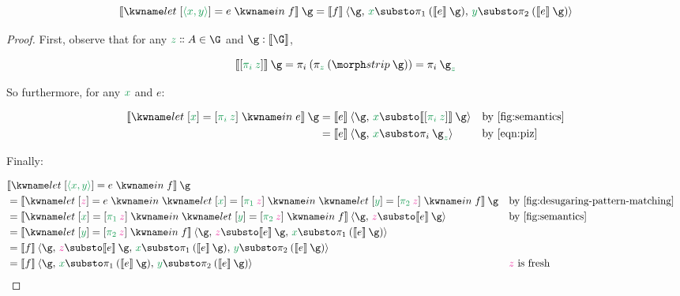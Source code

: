 \documentclass{rntz}\usepackage{fantasy}%
\begin{document}

\begin{lemma}\label{lem:letboxtuple}
  \[\den{\elet{\eboxd{\etuple{x,y}} = e} f} \<\g
  = \den{f} \<\extend{\g}{
    \dvar x \substo \pi_1\<(\den{e}\<\g),\,
    \dvar y \substo \pi_2 \<(\den{e}\<\g)}
  \]
\end{lemma}
\begin{proof}
  First, observe that for any $\hd z A \in \G$ and $\g : \den\G$,

  \nopagebreak[2]
  \begin{equation}\label{eqn:piz}
    \den{\eboxd{\pi_i\<\dvar z}}\<\g
  = \pi_i\<(\pi_{\dvar z}\<(\strip\<\g))
  = \pi_i\<\g_{\dvar z}
  \end{equation}

  \noindent So furthermore, for any $\dvar x$ and $e$:

  \nopagebreak[2]
  \begin{align*}
  \den{\elet{\eboxd{\dvar x} = \eboxd{\pi_i\<\dvar z}} e} \<\g
  &= \den{e} \<\extend{\g}{\dvar x \substo \den{\eboxd{\pi_i\<\dvar z}}\<\g}
  && \text{by \cref{fig:semantics}}\\
  &= \den{e} \<\extend{\g}{\dvar x \substo \pi_i\<\g_{\dvar z}}
  && \text{by \cref{eqn:piz}}
  \end{align*}

  \noindent
  Finally:

  \nopagebreak[2]
  \begin{align*}
    &\den{\elet{\eboxd{\etuple{x,y}} = e} f} \<\g\\
    &= \den{\elet{\eboxd{\freshvar z} = e}
      \elet{\eboxd{x} = \eboxd{\pi_1\<\freshvar z}}
      \elet{\eboxd{y} = \eboxd{\pi_2\<\freshvar z}}
      f}\<\g
    && \text{by \cref{fig:desugaring-pattern-matching}}\\
    &= \den{\elet{\eboxd{x} = \eboxd{\pi_1\<\freshvar z}}
      \elet{\eboxd{y} = \eboxd{\pi_2\<\freshvar z}} f}
    \<\extend{\g}{\freshvar z \substo \den{e} \<\g}
    && \text{by \cref{fig:semantics}}
    \\
    &= \den{\elet{\eboxd{y} = \eboxd{\pi_2\<\freshvar z}} f}
    \<\extend{\g}{
      \freshvar z \substo \den{e} \<\g,\,
      \dvar x \substo \pi_1\<(\den{e}\<\g)}
    \\
    &=
    \den{f} \<\extend{\g}{
      \freshvar z \substo \den{e} \<\g,\,
      \dvar x \substo \pi_1\<(\den{e}\<\g),\,
      \dvar y \substo \pi_2\<(\den{e}\<\g)}
    \\
    &=
    \den{f} \<\extend{\g}{
      \dvar x \substo \pi_1\<(\den{e}\<\g),\,
      \dvar y \substo \pi_2\<(\den{e}\<\g)}
    && \text{$\freshvar z$ is fresh}
  \end{align*}

  \noindent
\end{proof}
\end{document}

